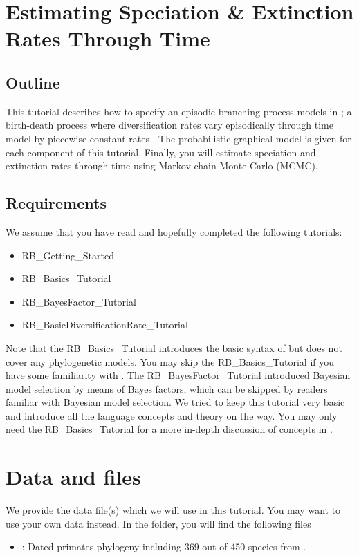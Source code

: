 \section{Estimating Speciation \& Extinction Rates Through Time}

\subsection{Outline}

This tutorial describes how to specify an episodic branching-process models in \RevBayes;
a birth-death process where diversification rates vary episodically through time model by piecewise constant rates \citep{Stadler2011,Hoehna2015a}.
The probabilistic graphical model is given for each component of this tutorial.
Finally, you will estimate speciation and extinction rates through-time using Markov chain Monte Carlo (MCMC).


\subsection{Requirements}
We assume that you have read and hopefully completed the following tutorials:
\begin{itemize}
\item RB\_Getting\_Started
\item RB\_Basics\_Tutorial
\item RB\_BayesFactor\_Tutorial
\item RB\_BasicDiversificationRate\_Tutorial
\end{itemize}
Note that the RB\_Basics\_Tutorial introduces the basic syntax of \Rev but does not cover any phylogenetic models.
You may skip the RB\_Basics\_Tutorial if you have some familiarity with \R.
The RB\_BayesFactor\_Tutorial introduced Bayesian model selection by means of Bayes factors, which can be skipped by readers familiar with Bayesian model selection.
We tried to keep this tutorial very basic and introduce all the language concepts and theory on the way.
You may only need the RB\_Basics\_Tutorial for a more in-depth discussion of concepts in \Rev.


\section{Data and files}

We provide the data file(s) which we will use in this tutorial.
You may want to use your own data instead.
In the  folder, you will find the following files
\begin{itemize}
\item {}: Dated primates phylogeny including 369 out of 450 species from \cite{Springer2012}.
\end{itemize}


